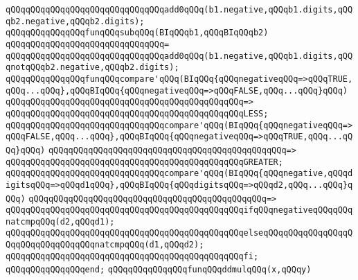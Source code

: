 \verb|qQQqqQQqqQQqqQQqqQQqqQQqqQQqqQQqadd0qQQq(b1.negative,qQQqb1.digits,qQQqb2.negative,qQQqb2.digits);|\newline
\newline
\newline
\newline
\verb|qQQqqQQqqQQqqQQqfunqQQqsubqQQq(BIqQQqb1,qQQqBIqQQqb2)|\newline
\verb|qQQqqQQqqQQqqQQqqQQqqQQqqQQqqQQq=|\newline
\verb|qQQqqQQqqQQqqQQqqQQqqQQqqQQqqQQqadd0qQQq(b1.negative,qQQqb1.digits,qQQqnotqQQqb2.negative,qQQqb2.digits);|\newline
\newline
\newline
\newline
\verb|qQQqqQQqqQQqqQQqfunqQQqcompare'qQQq(BIqQQq{qQQqnegativeqQQq=>qQQqTRUE,qQQq...qQQq},qQQqBIqQQq{qQQqnegativeqQQq=>qQQqFALSE,qQQq...qQQq}qQQq)|\newline
\verb|qQQqqQQqqQQqqQQqqQQqqQQqqQQqqQQqqQQqqQQqqQQqqQQq=>|\newline
\verb|qQQqqQQqqQQqqQQqqQQqqQQqqQQqqQQqqQQqqQQqqQQqqQQqLESS;|\newline
\newline
\verb|qQQqqQQqqQQqqQQqqQQqqQQqqQQqqQQqcompare'qQQq(BIqQQq{qQQqnegativeqQQq=>qQQqFALSE,qQQq...qQQq},qQQqBIqQQq{qQQqnegativeqQQq=>qQQqTRUE,qQQq...qQQq}qQQq)|\newline
\verb|qQQqqQQqqQQqqQQqqQQqqQQqqQQqqQQqqQQqqQQqqQQqqQQq=>|\newline
\verb|qQQqqQQqqQQqqQQqqQQqqQQqqQQqqQQqqQQqqQQqqQQqqQQqGREATER;|\newline
\newline
\verb|qQQqqQQqqQQqqQQqqQQqqQQqqQQqqQQqcompare'qQQq(BIqQQq{qQQqnegative,qQQqdigitsqQQq=>qQQqd1qQQq},qQQqBIqQQq{qQQqdigitsqQQq=>qQQqd2,qQQq...qQQq}qQQq)|\newline
\verb|qQQqqQQqqQQqqQQqqQQqqQQqqQQqqQQqqQQqqQQqqQQqqQQq=>|\newline
\verb|qQQqqQQqqQQqqQQqqQQqqQQqqQQqqQQqqQQqqQQqqQQqqQQqifqQQqnegativeqQQqqQQqnatcmpqQQq(d2,qQQqd1);|\newline
\verb|qQQqqQQqqQQqqQQqqQQqqQQqqQQqqQQqqQQqqQQqqQQqqQQqelseqQQqqQQqqQQqqQQqqQQqqQQqqQQqqQQqqQQqnatcmpqQQq(d1,qQQqd2);|\newline
\verb|qQQqqQQqqQQqqQQqqQQqqQQqqQQqqQQqqQQqqQQqqQQqqQQqfi;|\newline
\verb|qQQqqQQqqQQqqQQqend;|\newline
\newline
\verb|qQQqqQQqqQQqqQQqfunqQQqddmulqQQq(x,qQQqy)|\newline

